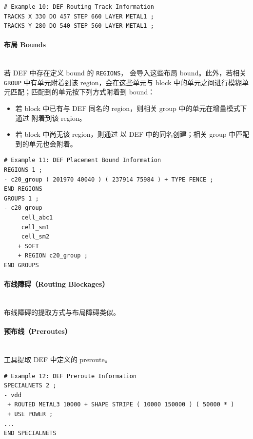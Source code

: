 \begin{lstlisting}
# Example 10: DEF Routing Track Information
TRACKS X 330 DO 457 STEP 660 LAYER METAL1 ;
TRACKS Y 280 DO 540 STEP 560 LAYER METAL1 ;
\end{lstlisting}

\paragraph{布局 Bounds}\mbox{}\\
若 DEF 中存在定义 bound 的 \texttt{REGIONS}， 会导入这些布局 bound。此外，若相关 \texttt{GROUP} 中有单元附着到该 region，会在这些单元与 block 中的单元之间进行模糊单元匹配；匹配到的单元按下列方式附着到 bound：
\begin{itemize}
  \item 若 block 中已有与 DEF 同名的 region，则相关 group 中的单元在增量模式下通过  附着到该 region。
  \item 若 block 中尚无该 region，则通过  以 DEF 中的同名创建；相关 group 中匹配到的单元也会附着。
\end{itemize}

\begin{lstlisting}
# Example 11: DEF Placement Bound Information
REGIONS 1 ;
- c20_group ( 201970 40040 ) ( 237914 75984 ) + TYPE FENCE ;
END REGIONS
GROUPS 1 ;
- c20_group
     cell_abc1
     cell_sm1
     cell_sm2
    + SOFT
    + REGION c20_group ;
END GROUPS
\end{lstlisting}

\paragraph{布线障碍（Routing Blockages）}\mbox{}\\
布线障碍的提取方式与布局障碍类似。

\paragraph{预布线（Preroutes）}\mbox{}\\
工具提取 DEF 中定义的 preroute。

\begin{lstlisting}
# Example 12: DEF Preroute Information
SPECIALNETS 2 ;
- vdd
 + ROUTED METAL3 10000 + SHAPE STRIPE ( 10000 150000 ) ( 50000 * )
 + USE POWER ;
...
END SPECIALNETS
\end{lstlisting}

